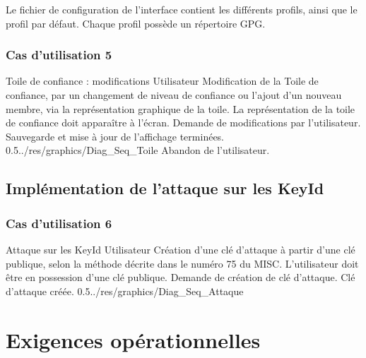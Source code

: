 \documentclass{../res/univ-projet}
\begin{document}
Le fichier de configuration de l'interface contient les différents profils, ainsi que le profil par défaut. Chaque profil possède un répertoire GPG.



  \subsubsection{Cas d'utilisation 5}
\ficheGraphic
{Toile de confiance : modifications}         
{Utilisateur}
{Modification de la Toile de confiance, par un changement de niveau de confiance ou l'ajout d'un nouveau membre, via la représentation graphique de la toile.}
{La représentation de la toile de confiance doit apparaître à l'écran.}
{Demande de modifications par l'utilisateur.}
{Sauvegarde et mise à jour de l'affichage terminées.}
{0.5}{../res/graphics/Diag_Seq_Toile}
{Abandon de l'utilisateur.}                      
\vspace{0.5cm}
  

\subsection{Implémentation de l'attaque sur les KeyId}
  
  \subsubsection{Cas d'utilisation 6}
\ficheGraphic
{Attaque sur les KeyId}
{Utilisateur}
{Création d'une clé d'attaque à partir d'une clé publique, selon la méthode décrite dans le numéro 75 du MISC.}
{L'utilisateur doit être en possession d'une clé publique.}
{Demande de création de clé d'attaque.}
{Clé d'attaque créée.}
{0.5}{../res/graphics/Diag_Seq_Attaque}
{}
\vspace{0.5cm}
  
\newpage

\section{Exigences opérationnelles}
\end{document}
